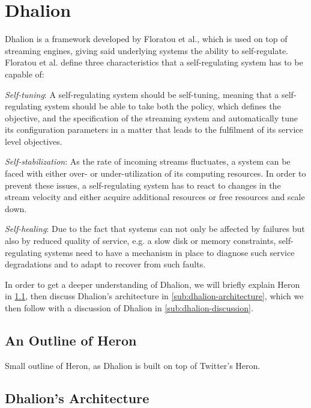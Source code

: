     \section{Dhalion}
    \label{sec:dhalion}
    Dhalion is a framework developed by Floratou et al., which is used on top of streaming engines, giving said underlying systems the ability to self-regulate.  
    Floratou et al. define three characteristics that a self-regulating system has to be capable of:
    
    \quad \textit{Self-tuning}: A self-regulating system should be self-tuning, meaning that a self-regulating system should 
    be able to take both the policy, which defines the objective, and the specification of the streaming system and automatically tune 
    its configuration parameters in a matter that leads to the fulfilment of its service level objectives.
    
    \quad \textit{Self-stabilization}: As the rate of incoming streams fluctuates, a system can be faced with either over- or under-utilization of its computing resources. 
    In order to prevent these issues, a self-regulating system has to react to changes in the stream velocity and either acquire additional resources 
    or free resources and scale down.

    \quad \textit{Self-healing}: Due to the fact that systems can not only be affected by failures but also by reduced quality of service, 
    e.g. a slow disk or memory constraints, self-regulating systems need to have a mechanism in place to diagnose such service degradations and to adapt 
    to recover from such faults.

    In order to get a deeper understanding of Dhalion, we will briefly explain Heron in \ref{sub:heron-outline}, then discuss Dhalion's architecture in \ref{sub:dhalion-architecture}, 
    which we then follow with a discussion of Dhalion in \ref{sub:dhalion-discussion}.

        \subsection{An Outline of Heron}
        \label{sub:heron-outline}
        Small outline of Heron, as Dhalion is built on top of Twitter's Heron.

        \subsection{Dhalion's Architecture}
        
